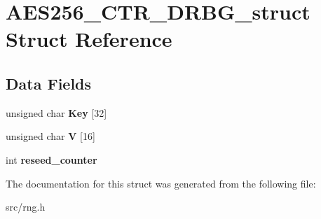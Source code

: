 \hypertarget{structAES256__CTR__DRBG__struct}{}\section{A\+E\+S256\+\_\+\+C\+T\+R\+\_\+\+D\+R\+B\+G\+\_\+struct Struct Reference}
\label{structAES256__CTR__DRBG__struct}
\subsection*{Data Fields}
\begin{DoxyCompactItemize}
\item 
\mbox{\label{structAES256__CTR__DRBG__struct_a9e6db229bc3b894fd8d647367b2bbd9f}} 
unsigned char {\bfseries Key} \mbox{[}32\mbox{]}
\item 
\mbox{\label{structAES256__CTR__DRBG__struct_a4f688fb7ba4142ae56d4aaa58f508f03}} 
unsigned char {\bfseries V} \mbox{[}16\mbox{]}
\item 
\mbox{\label{structAES256__CTR__DRBG__struct_ad134015fd195406e6403e70bb108839c}} 
int {\bfseries reseed\+\_\+counter}
\end{DoxyCompactItemize}


The documentation for this struct was generated from the following file\+:\begin{DoxyCompactItemize}
\item 
src/rng.\+h\end{DoxyCompactItemize}
